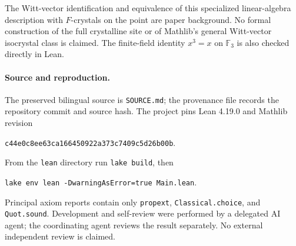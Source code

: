 \documentclass[11pt]{article}
\begin{document}
The Witt-vector identification and equivalence of this specialized
linear-algebra description with $F$-crystals on the point are
paper background. No formal construction of the full crystalline
site or of Mathlib's general Witt-vector isocrystal class is
claimed. The finite-field identity $x^3=x$ on $\mathbb F_3$ is
also checked directly in Lean.

\paragraph{Source and reproduction.}
The preserved bilingual source is \texttt{SOURCE.md}; the
provenance file records the repository commit and source hash.
The project pins Lean 4.19.0 and Mathlib revision
\begin{center}\texttt{c44e0c8ee63ca166450922a373c7409c5d26b00b}.\end{center}
From the \texttt{lean} directory run \texttt{lake build}, then
\begin{center}\texttt{lake env lean -DwarningAsError=true Main.lean}.\end{center}
Principal axiom reports contain only \texttt{propext},
\texttt{Classical.choice}, and \texttt{Quot.sound}.
Development and self-review were performed by a delegated AI
agent; the coordinating agent reviews the result separately.
No external independent review is claimed.
\end{document}
